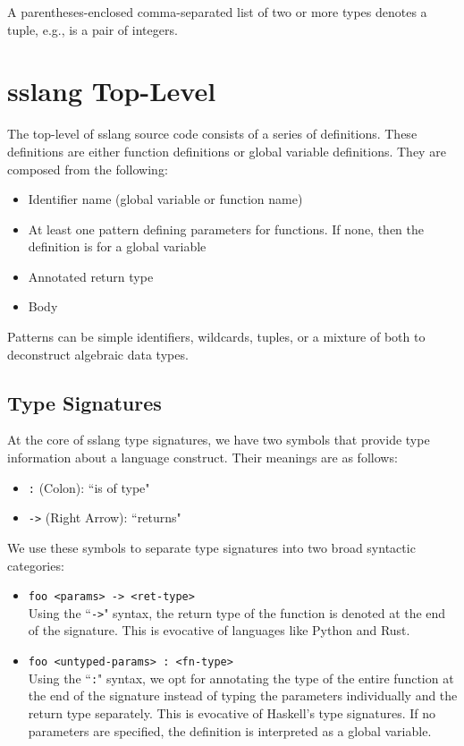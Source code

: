 \documentclass{article}
\begin{document}
A parentheses-enclosed comma-separated list of two or more types
denotes a tuple, e.g., \lit*{(}  \lit*{,} 
\lit*{)} is a pair of integers.

\section{sslang Top-Level}
The top-level of sslang source code consists of a series of definitions. These definitions are either function definitions or global variable definitions. They are composed from the following:
\begin{itemize}
    \item Identifier name (global variable or function name)
    \item At least one pattern defining parameters for functions. If none, then the definition is for a global variable
    \item Annotated return type
    \item Body
\end{itemize}

Patterns can be simple identifiers, wildcards, tuples, or a mixture of both to deconstruct algebraic data types.
\subsection{Type Signatures}
At the core of sslang type signatures, we have two symbols that provide type information about a language construct. Their meanings are as follows:
\begin{itemize}
    \item \texttt{:} (Colon): ``is of type"
    \item \texttt{->} (Right Arrow): ``returns"
\end{itemize}

We use these symbols to separate type signatures into two broad syntactic categories:
\begin{itemize}
    \item \texttt{foo <params> -> <ret-type>}\\
          Using the ``\texttt{->}" syntax, the return type of the function is denoted at the end of the signature. This is evocative of languages like Python and Rust.
    \item \texttt{foo <untyped-params> : <fn-type>}\\
          Using the ``\texttt{:}" syntax, we opt for annotating the type of the entire function at the end of the signature instead of typing the parameters individually and the return type separately. This is evocative of Haskell's type signatures. If no parameters are specified, the definition is interpreted as a global variable.
\end{itemize}
\end{document}
